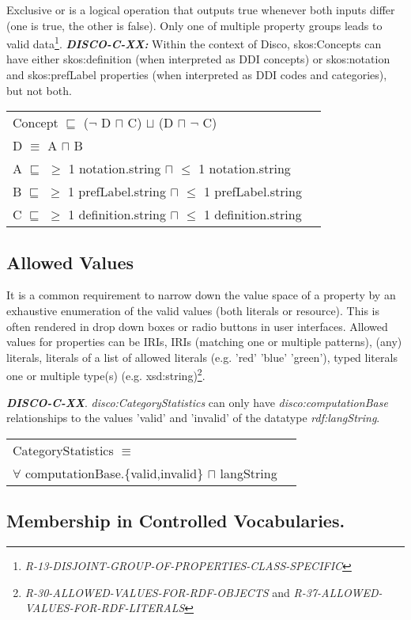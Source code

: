 \documentclass{elsart3p}    %
\newenvironment{DL}{
  \vspace{0cm}
  \begin{tabular}{l l}

}{
  \end{tabular}
}
\begin{document}
Exclusive or is a logical operation that outputs true whenever both inputs differ (one is true, the other is false).
Only one of multiple property groups leads to valid data\footnote{{\em R-13-DISJOINT-GROUP-OF-PROPERTIES-CLASS-SPECIFIC}}.
\textbf{{\em DISCO-C-XX:}}
Within the context of Disco, skos:Concepts can have either skos:definition (when interpreted as DDI concepts) or skos:notation and skos:prefLabel properties (when interpreted as DDI codes and categories), but not both.

\begin{DL}
Concept $\sqsubseteq$ ($\neg$ D $\sqcap$ C) $\sqcup$ (D $\sqcap$ $\neg$ C) \\ 
D $\equiv$ A $\sqcap$ B \\
A $\sqsubseteq$ $\geq$ 1 notation.string $\sqcap$ $\leq$ 1 notation.string \\
B $\sqsubseteq$ $\geq$ 1 prefLabel.string $\sqcap$ $\leq$ 1 prefLabel.string \\
C $\sqsubseteq$ $\geq$ 1 definition.string $\sqcap$ $\leq$ 1 definition.string \\
\end{DL}

\subsection{Allowed Values}

It is a common requirement to narrow down the value space of a property by an exhaustive enumeration of the valid values (both literals or resource). 
This is often rendered in drop down boxes or radio buttons in user interfaces. 
Allowed values for properties can be IRIs, IRIs (matching one or multiple patterns), (any) literals, literals of a list of allowed literals (e.g. 'red' 'blue' 'green'), typed literals one or multiple type(s) (e.g. xsd:string)\footnote{{\em R-30-ALLOWED-VALUES-FOR-RDF-OBJECTS} and 
{\em R-37-ALLOWED-VALUES-FOR-RDF-LITERALS}}.

\textbf{{\em DISCO-C-XX}}.
{\em disco:CategoryStatistics} can only have {\em disco:computationBase} relationships to the values 'valid' and 'invalid' of the datatype {\em rdf:langString}.

\begin{DL}
CategoryStatistics $\equiv$ \\ $\forall$ computationBase.\{valid,invalid\} $\sqcap$ langString \\
\end{DL}

\subsection{Membership in Controlled Vocabularies.}
\end{document}
